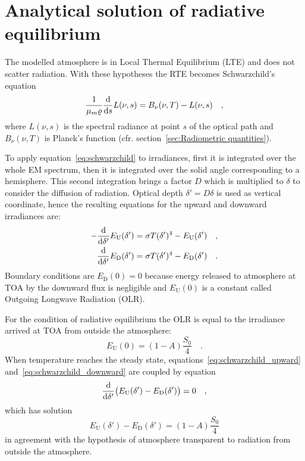 \documentclass[a4paper,10pt,twocolumn,\classoptions]{article}
\begin{document}
\section{Analytical solution of radiative equilibrium}
The modelled atmosphere is in Local Thermal Equilibrium (LTE) and does not scatter radiation. With these hypotheses the RTE becomes Schwarzchild's equation
\begin{equation}
  \label{eq:schwarzchild}
  \frac{1}{\mu_m \varrho} \odv*{L(\nu, s)}{s} = B_\nu(\nu, T) - L(\nu, s)
  \quad ,
\end{equation}
where $L(\nu, s)$ is the spectral radiance at point $s$ of the optical path and $B_\nu(\nu, T)$ is Planck's function (cfr. section~\ref{sec:Radiometric quantities}).

To apply equation~\eqref{eq:schwarzchild} to irradiances, first it is integrated over the whole EM spectrum, then it is integrated over the solid angle corresponding to a hemisphere. This second integration brings a factor $D$ which is multiplied to $\delta$ to consider the diffusion of radiation.
Optical depth $\delta' = D \delta$ is used as vertical coordinate, hence the resulting equations for the upward and downward irradiances are:
\begin{align}
  \label{eq:schwarzchild_upward}
  - \odv*{E_\text{U}(\delta')}{\delta'} & = \sigma T(\delta')^4 - E_\text{U}(\delta') \quad , \\
  \label{eq:schwarzchild_downward}
  \odv*{E_\text{D}(\delta')}{\delta'} & = \sigma T(\delta')^4 - E_\text{D}(\delta')
  \quad .
\end{align}
Boundary conditions are $E_\text{D}(0) = 0$ because energy released to atmosphere at TOA by the downward flux is negligible and $E_\text{U}(0)$ is a constant called Outgoing Longwave Radiation (OLR).

For the condition of radiative equilibrium the OLR is equal to the irradiance arrived at TOA from outside the atmosphere:
\begin{equation}
  \label{eq:radiative_equilibrium}
  E_\text{U}(0) = (1 - A) \frac{S_0}{4}
  \quad .
\end{equation}
When temperature reaches the steady state, equations~\eqref{eq:schwarzchild_upward} and~\eqref{eq:schwarzchild_downward} are coupled by equation
\begin{equation}
  \label{eq:temperature_steady_state}
  \odv*{\big( E_\text{U}(\delta') - E_\text{D}(\delta') \big)}{\delta'} = 0
  \quad ,
\end{equation}
which has solution
\begin{equation}
  \label{eq:temperature_steady_state_solution}
  E_\text{U}(\delta') - E_\text{D}(\delta') = (1 - A) \frac{S_0}{4}
\end{equation}
in agreement with the hypothesis of atmosphere transparent to radiation from outside the atmosphere.
\end{document}
